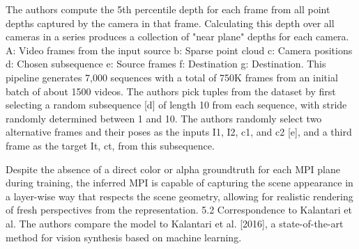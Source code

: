 The authors compute the 5th percentile depth for each frame from all point depths captured by the camera in that frame.
Calculating this depth over all cameras in a series produces a collection of "near plane" depths for each camera.
A: Video frames from the input source b: Sparse point cloud c: Camera positions d: Chosen subsequence e: Source frames f: Destination g: Destination.
This pipeline generates 7,000 sequences with a total of 750K frames from an initial batch of about 1500 videos.
The authors pick tuples from the dataset by first selecting a random subsequence [d] of length 10 from each sequence, with stride randomly determined between 1 and 10.
The authors randomly select two alternative frames and their poses as the inputs I1, I2, c1, and c2 [e], and a third frame as the target It, ct, from this subsequence.

Despite the absence of a direct color or alpha groundtruth for each MPI plane during training, the inferred MPI is capable of capturing the scene appearance in a layer-wise way that respects the scene geometry, allowing for realistic rendering of fresh perspectives from the representation.
5.2 Correspondence to Kalantari et al. The authors compare the model to Kalantari et al. [2016], a state-of-the-art method for vision synthesis based on machine learning.

